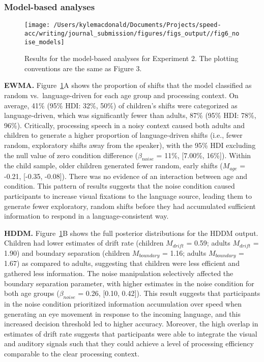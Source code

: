 \documentclass[,man,floatsintext]{apa6}
\begin{document}
\hypertarget{model-based-analyses-1}{%
\subsubsection{Model-based analyses}\label{model-based-analyses-1}}

\begin{figure}[!t]

{\centering \texttt{[image: /Users/kylemacdonald/Documents/Projects/speed-acc/writing/journal\_submission/figures/figs\_output//fig6\_noise\_models]} 

}

\caption{Results for the model-based analyses for Experiment 2. The plotting conventions are the same as Figure 3.}\label{fig:noise-model-plots}
\end{figure}

\textbf{EWMA.} Figure~\ref{fig:noise-model-plots}A shows the proportion
of shifts that the model classified as random vs.~language-driven for
each age group and processing context. On average, 41\% (95\% HDI: 32\%,
50\%) of children's shifts were categorized as language-driven, which
was significantly fewer than adults, 87\% (95\% HDI: 78\%, 96\%).
Critically, processing speech in a noisy context caused both adults and
children to generate a higher proportion of language-driven shifts
(i.e., fewer random, exploratory shifts away from the speaker), with the
95\% HDI excluding the null value of zero condition difference
(\(\beta_{noise}\) = 11\%, {[}7.00\%, 16\%{]}). Within the child sample,
older children generated fewer random, early shifts (\(M_{age}\) =
-0.21, {[}-0.35, -0.08{]}). There was no evidence of an interaction
between age and condition. This pattern of results suggests that the
noise condition caused participants to increase visual fixations to the
language source, leading them to generate fewer exploratory, random
shifts before they had accumulated sufficient information to respond in
a language-consistent way.

\textbf{HDDM.} Figure~\ref{fig:noise-model-plots}B shows the full
posterior distributions for the HDDM output. Children had lower
estimates of drift rate (children \(M_{drift}\) = 0.59; adults
\(M_{drift}\) = 1.90) and boundary separation (children \(M_{boundary}\)
= 1.16; adults \(M_{boundary}\) = 1.67) as compared to adults,
suggesting that children were less efficient and gathered less
information. The noise manipulation selectively affected the boundary
separation parameter, with higher estimates in the noise condition for
both age groups (\(\beta_{noise}\) = 0.26, {[}0.10, 0.42{]}). This
result suggests that participants in the noise condition prioritized
information accumulation over speed when generating an eye movement in
response to the incoming language, and this increased decision threshold
led to higher accuracy. Moreover, the high overlap in estimates of drift
rate suggests that participants were able to integrate the visual and
auditory signals such that they could achieve a level of processing
efficiency comparable to the clear processing context.
\end{document}
